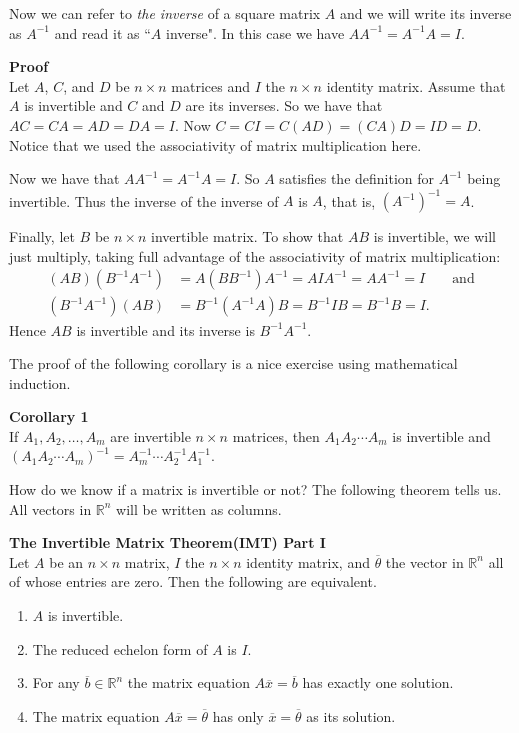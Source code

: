 \documentclass[12pt]{article}
\def\it{\item}
\def\be{\begin{enumerate}} \def\ee{\end{enumerate}}
\def\bar#1{\overline{#1}}
\def\th{\theta} \def\al{\alpha} \def\ba{\beta} \def\ga{\gamma}
\def\R{\mathbb{R}} \def\Q{\mathbb{Q}} \def\N{\mathbb{N}} \def\Z{\mathbb{Z}} \def\P{\mathbb{P}}
\begin{document}
Now we can refer to {\itshape the inverse} of a square matrix $A$ and we will write its inverse as $A^{-1}$ and read it as ``$A$ inverse". In this case
we have $AA^{-1} = A^{-1}A = I$.

{\bf Proof} \\
Let $A$, $C$, and $D$ be $n \times n$ matrices and $I$ the $n \times n$ identity matrix. Assume that $A$ is invertible and $C$ and $D$ are its inverses. So we have that $AC = CA = AD = DA = I$. Now $C = CI = C(AD) = (CA)D = ID = D$. Notice that we used the associativity of matrix multiplication here.

Now we have that $AA^{-1} = A^{-1}A = I$. So $A$ satisfies the definition for $A^{-1}$ being invertible. Thus the inverse of the inverse of $A$ is $A$, that is, $(A^{-1})^{-1} = A$. 

Finally, let $B$ be $n \times n$ invertible matrix. 
To show that $AB$ is invertible, we will just multiply, taking full advantage of the associativity of matrix multiplication:
\begin{align*}
(AB)(B^{-1}A^{-1}) &= A(BB^{-1})A^{-1} = AIA^{-1} = AA^{-1} = I &&\text{and} \\
(B^{-1}A^{-1})(AB) &= B^{-1}(A^{-1}A)B = B^{-1}IB = B^{-1}B = I. 
\end{align*}
Hence $AB$ is invertible and its inverse is $B^{-1}A^{-1}$.

The proof of the following corollary is a nice exercise using mathematical induction.

\begin{framed}
{\bf Corollary 1} \\
If $A_1, A_2, \ldots, A_m$ are invertible $n \times n$ matrices, then $A_1 A_2 \cdots A_m$ is invertible and $(A_1 A_2 \cdots A_m)^{-1} = A_{m}^{-1} \cdots A_{2}^{-1} A_{1}^{-1}$.
\end{framed}

How do we know if a matrix is invertible or not? The following theorem tells us. All vectors in $\R^n$ will be written as columns.

\begin{framed}
{\bf The Invertible Matrix Theorem(IMT) Part I} \\
Let $A$ be an $n \times n$ matrix, $I$ the $n \times n$ identity matrix, and $\bar{\th}$ the vector in $\R^n$ all of whose entries are zero. Then the following are equivalent.
\be
\it $A$ is invertible.
\it The reduced echelon form of $A$ is $I$.
\it For any $\bar{b} \in \R^n$ the matrix equation $A\bar{x} = \bar{b}$ has exactly one solution.
\it The matrix equation $A\bar{x} = \bar{\th}$ has only $\bar{x} = \bar{\th}$ as its solution.
\ee
\end{framed}
\end{document}
